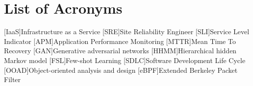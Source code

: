\chapter*{List of Acronyms}

\begin{acronym}
[IaaS]{Infrastructure as a Service}
[SRE]{Site Reliability Engineer}
[SLI]{Service Level Indicator}
[APM]{Application Performance Monitoring}
[MTTR]{Mean Time To Recovery}
[GAN]{Generative adversarial networks}
[HHMM]{Hierarchical hidden Markov model}
[FSL]{Few-shot Learning}
[SDLC]{Software Development Life Cycle}
[OOAD]{Object-oriented analysis and design}
[eBPF]{Extended Berkeley Packet Filter}
\end{acronym}